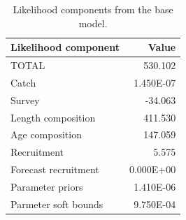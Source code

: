 \documentclass[12pt,]{article}
\begin{document}
\FloatBarrier

\begin{table}[ht]
\centering
\caption{Likelihood components from the base model.} 
\label{tab:like_components}
\begin{tabular}{lr}
  \hline
Likelihood component & Value \\ 
  \hline
TOTAL & 530.102 \\ 
  Catch & 1.450E-07 \\ 
  Survey & -34.063 \\ 
  Length composition & 411.530 \\ 
  Age composition & 147.059 \\ 
  Recruitment & 5.575 \\ 
  Forecast recruitment & 0.000E+00 \\ 
  Parameter priors & 1.410E-06 \\ 
  Parmeter soft bounds & 9.750E-04 \\ 
   \hline
\end{tabular}
\end{table}

\newpage
\end{document}
